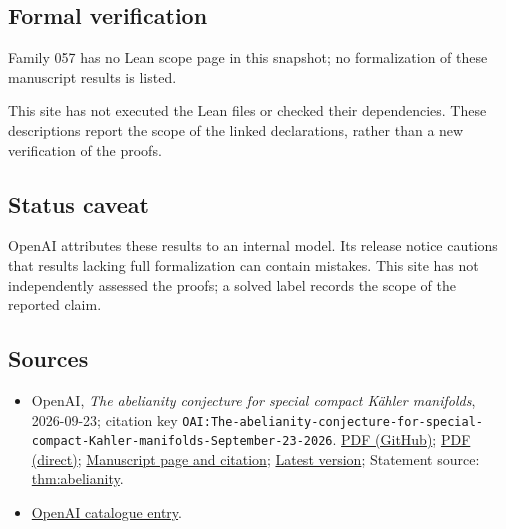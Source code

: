 \documentclass[11pt]{article}
\begin{document}
\subsection{Formal verification}
Family 057 has no Lean scope page in this snapshot; no formalization of these manuscript results is listed.

This site has not executed the Lean files or checked their dependencies. These descriptions report the scope of the linked declarations, rather than a new verification of the proofs.

\subsection{Status caveat}
OpenAI attributes these results to an internal model. Its release notice cautions that results lacking full formalization can contain mistakes. This site has not independently assessed the proofs; a solved label records the scope of the reported claim.

\subsection{Sources}
\begin{itemize}
\item OpenAI, \emph{The abelianity conjecture for special compact Kähler manifolds}, 2026-09-23; citation key \texttt{OAI:The-abelianity-conjecture-for-special-compact-Kahler-manifolds-September-23-2026}. \href{https://github.com/openai/math/blob/adc7f1241b42e322a6451854ab7e4b4c146bf78a/preprints/The-abelianity-conjecture-for-special-compact-Kahler-manifolds-September-23-2026/paper.pdf}{PDF (GitHub)}; \href{https://github.com/openai/math/raw/adc7f1241b42e322a6451854ab7e4b4c146bf78a/preprints/The-abelianity-conjecture-for-special-compact-Kahler-manifolds-September-23-2026/paper.pdf}{PDF (direct)}; \href{https://github.com/openai/math/blob/adc7f1241b42e322a6451854ab7e4b4c146bf78a/preprints/The-abelianity-conjecture-for-special-compact-Kahler-manifolds-September-23-2026/README.md}{Manuscript page and citation}; \href{https://github.com/openai/math/blob/main/preprints/The-abelianity-conjecture-for-special-compact-Kahler-manifolds-September-23-2026/paper.pdf}{Latest version}; Statement source: \href{https://github.com/openai/math/blob/adc7f1241b42e322a6451854ab7e4b4c146bf78a/preprints/The-abelianity-conjecture-for-special-compact-Kahler-manifolds-September-23-2026/build/sections/introduction.tex\#L26}{thm:abelianity}.
\item \href{https://github.com/openai/math/blob/adc7f1241b42e322a6451854ab7e4b4c146bf78a/CONTENTS.md}{OpenAI catalogue entry}.
\end{itemize}
\end{document}
